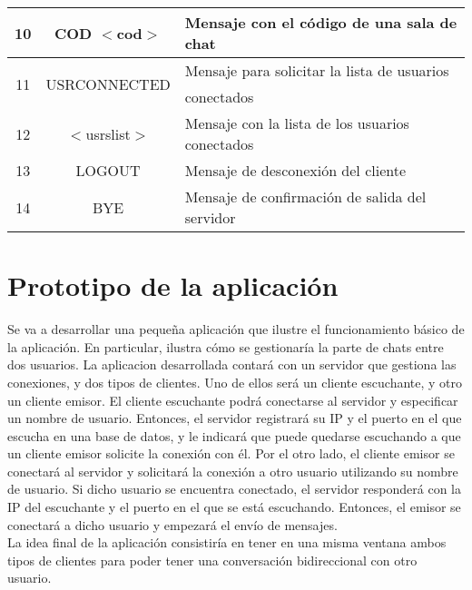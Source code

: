 \documentclass[12pt]{article}       %
\begin{document}
\begin{center}
\begin{tabular}{|c|c|l|}
10 & COD $<$cod$>$ & Mensaje con el código de una sala de chat\\
\hline
\multirow{2}{*}{11} & \multirow{2}{*}{USRCONNECTED} & Mensaje para solicitar la lista de usuarios\\
					& 								& conectados\\
\hline
12 & $<$usrslist$>$ & Mensaje con la lista de los usuarios conectados\\
\hline
13 & LOGOUT & Mensaje de desconexión del cliente\\
\hline
14 & BYE & Mensaje de confirmación de salida del servidor \\
\hline
\end{tabular}
\end{center}

\section{Prototipo de la aplicación}

Se va a desarrollar una pequeña aplicación que ilustre el funcionamiento básico de la aplicación. En particular, ilustra cómo se gestionaría la parte de chats entre dos usuarios. La aplicacion desarrollada contará con un servidor que gestiona las conexiones, y dos tipos de clientes. Uno de ellos será un cliente escuchante, y otro un cliente emisor. El cliente escuchante podrá conectarse al servidor y especificar un nombre de usuario. Entonces, el servidor registrará su IP y el puerto en el que escucha en una base de datos, y le indicará que puede quedarse escuchando a que un cliente emisor solicite la conexión con él. Por el otro lado, el cliente emisor se conectará al servidor y solicitará la conexión a otro usuario utilizando su nombre de usuario. Si dicho usuario se encuentra conectado, el servidor responderá con la IP del escuchante y el puerto en el que se está escuchando. Entonces, el emisor se conectará a dicho usuario y empezará el envío de mensajes.\\

La idea final de la aplicación consistiría en tener en una misma ventana ambos tipos de clientes para poder tener una conversación bidireccional con otro usuario.
\end{document}
